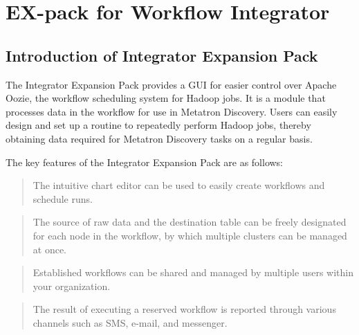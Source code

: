 \documentclass[letterpaper,10pt,english]{sphinxmanual}
\begin{document}
\part{EX-pack for Workflow Integrator}
\label{\detokenize{index:ex-pack-for-workflow-integrator}}

\chapter{Introduction of Integrator Expansion Pack}
\label{\detokenize{integrator/part01/index:integrator}}\label{\detokenize{integrator/part01/index::doc}}
The Integrator Expansion Pack provides a GUI for easier control over Apache Oozie, the workflow scheduling system for Hadoop jobs. It is a module that processes data in the workflow for use in Metatron Discovery. Users can easily design and set up a routine to repeatedly perform Hadoop jobs, thereby obtaining data required for Metatron Discovery tasks on a regular basis.

The key features of the Integrator Expansion Pack are as follows:

\begin{quote}

The intuitive chart editor can be used to easily create workflows and schedule runs.
\end{quote}

\begin{quote}

The source of raw data and the destination table can be freely designated for each node in the workflow, by which multiple clusters can be managed at once.
\end{quote}

\begin{quote}

Established workflows can be shared and managed by multiple users within your organization.
\end{quote}

\begin{quote}

The result of executing a reserved workflow is reported through various channels such as SMS, e-mail, and messenger.
\end{quote}
\end{document}
